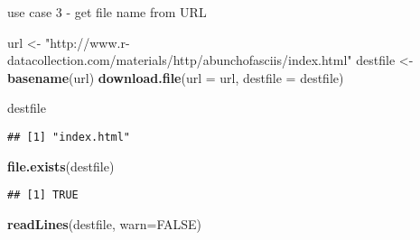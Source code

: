 \documentclass[ignorenonframetext,]{beamer}
\newenvironment{Shaded}{\begin{snugshade}}{\end{snugshade}}
\newcommand{\KeywordTok}[1]{\textcolor[rgb]{0.13,0.29,0.53}{\textbf{{#1}}}}
\newcommand{\DataTypeTok}[1]{\textcolor[rgb]{0.13,0.29,0.53}{{#1}}}
\newcommand{\StringTok}[1]{\textcolor[rgb]{0.31,0.60,0.02}{{#1}}}
\newcommand{\OtherTok}[1]{\textcolor[rgb]{0.56,0.35,0.01}{{#1}}}
\newcommand{\NormalTok}[1]{{#1}}
\begin{document}
\begin{frame}[fragile]{use case 3 - get file name from URL}

\begin{Shaded}
\begin{Highlighting}[]
\NormalTok{url      <-}\StringTok{ "http://www.r-datacollection.com/materials/http/abunchofasciis/index.html"}
\NormalTok{destfile <-}\StringTok{ }\KeywordTok{basename}\NormalTok{(url)}
\KeywordTok{download.file}\NormalTok{(}\DataTypeTok{url =} \NormalTok{url, }\DataTypeTok{destfile =} \NormalTok{destfile)}
\end{Highlighting}
\end{Shaded}

\begin{Shaded}
\begin{Highlighting}[]
\NormalTok{destfile}
\end{Highlighting}
\end{Shaded}

\begin{verbatim}
## [1] "index.html"
\end{verbatim}

\begin{Shaded}
\begin{Highlighting}[]
\KeywordTok{file.exists}\NormalTok{(destfile)}
\end{Highlighting}
\end{Shaded}

\begin{verbatim}
## [1] TRUE
\end{verbatim}

\begin{Shaded}
\begin{Highlighting}[]
\KeywordTok{readLines}\NormalTok{(destfile, }\DataTypeTok{warn=}\OtherTok{FALSE}\NormalTok{)}
\end{Highlighting}
\end{Shaded}


\end{frame}
\end{document}
